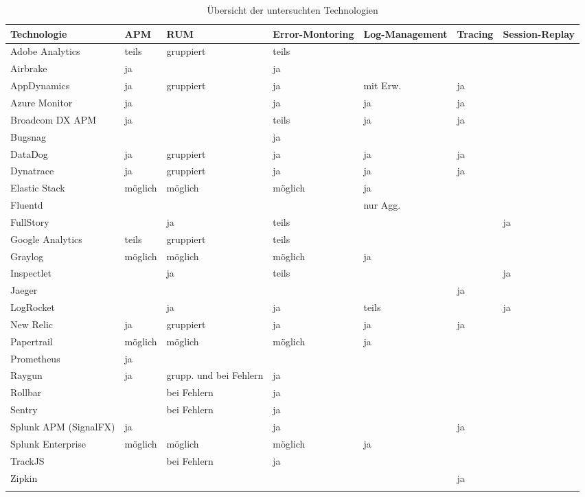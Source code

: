 \begingroup
\centering
\setlength{\LTleft}{-20cm plus -1fill}
\setlength{\LTright}{\LTleft}
\begin{longtable}{|p{4.15cm}|p{1.4cm}|p{2.0cm}|p{1.9cm}|p{2.0cm}|p{1.4cm}|p{1.4cm}|}
\hline
Technologie & APM & RUM & Error-Montoring & Log-Management & Tracing & Session-Replay \\
\endhead
\hline
Adobe Analytics & teils & gruppiert & teils &  &  &  \\
\hline
Airbrake & ja &  & ja &  &  &  \\
\hline
AppDynamics & ja & gruppiert & ja & mit Erw. & ja &  \\
\hline
Azure Monitor & ja &  & ja & ja & ja &  \\
\hline
Broadcom DX APM & ja &  & teils & ja & ja &  \\
\hline
Bugsnag &  &  & ja &  &  &  \\
\hline
DataDog & ja & gruppiert & ja & ja & ja &  \\
\hline
Dynatrace & ja & gruppiert & ja & ja & ja &  \\
\hline
Elastic Stack & möglich & möglich & möglich & ja &  &  \\
\hline
Fluentd &  &  &  & nur Agg. &  &  \\
\hline
FullStory &  & ja & teils &  &  & ja \\
\hline
Google Analytics & teils & gruppiert & teils &  &  &  \\
\hline
Graylog & möglich & möglich & möglich & ja &  &  \\
\hline
Inspectlet &  & ja & teils &  &  & ja \\
\hline
Jaeger &  &  &  &  & ja &  \\
\hline
LogRocket &  & ja & ja & teils &  & ja \\
\hline
New Relic & ja & gruppiert & ja & ja & ja &  \\
\hline
Papertrail & möglich & möglich & möglich & ja &  &  \\
\hline
Prometheus & ja &  &  &  &  &  \\
\hline
Raygun & ja & grupp. und bei \mbox{Fehlern} & ja &  &  &  \\
\hline
Rollbar &  & bei \mbox{Fehlern} & ja &  &  &  \\
\hline
Sentry &  & bei \mbox{Fehlern} & ja &  &  &  \\
\hline
Splunk APM (SignalFX) & ja &  & ja &  & ja &  \\
\hline
Splunk \mbox{Enterprise} & möglich & möglich & möglich & ja &  &  \\
\hline
TrackJS &  & bei \mbox{Fehlern} & ja &  &  &  \\
\hline
Zipkin &  &  &  &  & ja &  \\
\hline
\caption{Übersicht der untersuchten Technologien}
\label{tab:technologie-uebersicht}
\end{longtable}
\endgroup
